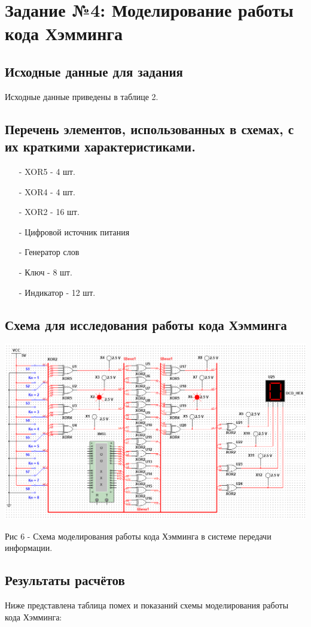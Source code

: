 \documentclass[11pt]{article}
\begin{document}
\section{Задание №4: Моделирование работы кода Хэмминга}
\subsection{Исходные данные для задания}
Исходные данные приведены в таблице 2.
\subsection{Перечень элементов, использованных в схемах, с их краткими характеристиками.}
\begin{itemize}
    \item [-] XOR5 - 4 шт.
    \item [-] XOR4 - 4 шт.
    \item [-] XOR2 - 16 шт.
    \item [-] Цифровой источник питания
    \item [-] Генератор слов
    \item [-] Ключ - 8 шт.
    \item [-] Индикатор - 12 шт.
\end{itemize}
\subsection{Схема для исследования работы кода Хэмминга}
\includegraphics[width=1\linewidth]{img/scheme2.png}
\begin{center}
        Рис 6 - Схема моделирования работы кода Хэмминга в системе передачи информации.
\end{center}

\subsection{Результаты расчётов}
Ниже представлена таблица помех и показаний схемы моделирования работы кода Хэмминга:
\end{document}

